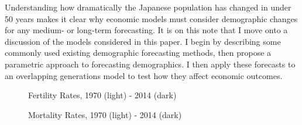 \documentclass[10pt]{article}
\renewcommand{\thesection}{\arabic{section}}
\renewcommand{\section}[2][]{\oldsection[#1]{#2}\index{#1}\label{sec:\thesection}}
\numberwithin{equation}{subsection}
\newcommand*{\FigureDir}{../../graphs}
\begin{document}
\par Understanding how dramatically the Japanese population has changed in under 50 years makes it clear why economic models must consider demographic changes for any \mbox{medium-} or long-term forecasting. It is on this note that I move onto a discussion of the models considered in this paper. I begin by describing some commonly used existing demographic forecasting methods, then propose a parametric approach to forecasting demographics. I then apply these forecasts to an overlapping generations model to test how they affect economic outcomes.

\begin{figure}[!ht]
   \centering
   \caption{\label{fig:fert_data}Fertility Rates, 1970 (light) - 2014 (dark)}
\end{figure}

\begin{figure}[!ht]
   \centering
   \caption{\label{fig:mort_data}Mortality Rates, 1970 (light) - 2014 (dark)}
\end{figure}


\section{Model}
\end{document}
